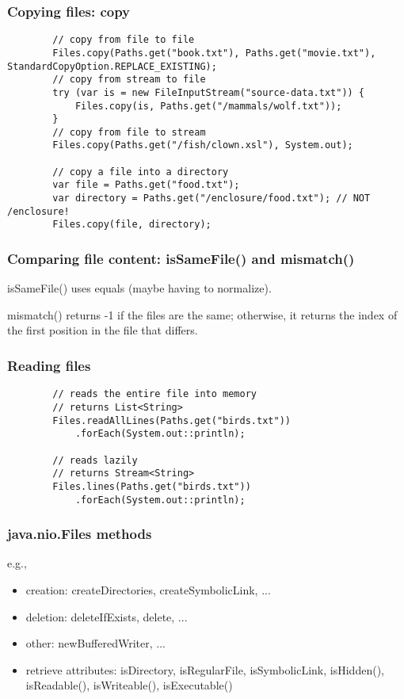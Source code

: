 \documentclass{scrartcl}
\begin{document}
\subsubsection{Copying files: copy}

    \begin{lstlisting}
        // copy from file to file
        Files.copy(Paths.get("book.txt"), Paths.get("movie.txt"), StandardCopyOption.REPLACE_EXISTING);
        // copy from stream to file
        try (var is = new FileInputStream("source-data.txt")) {
            Files.copy(is, Paths.get("/mammals/wolf.txt"));
        }
        // copy from file to stream
        Files.copy(Paths.get("/fish/clown.xsl"), System.out);

        // copy a file into a directory
        var file = Paths.get("food.txt");
        var directory = Paths.get("/enclosure/food.txt"); // NOT /enclosure!
        Files.copy(file, directory);
    \end{lstlisting}

\subsubsection{Comparing file content: isSameFile() and mismatch()}
    isSameFile() uses equals (maybe having to normalize).

    mismatch() returns -1 if the files are the same; otherwise, it returns the index of the first position in the file that differs.

\subsubsection{Reading files}

    \begin{lstlisting}
        // reads the entire file into memory
        // returns List<String>
        Files.readAllLines(Paths.get("birds.txt"))
            .forEach(System.out::println);

        // reads lazily
        // returns Stream<String>
        Files.lines(Paths.get("birds.txt"))
            .forEach(System.out::println);
    \end{lstlisting}

\subsubsection{java.nio.Files methods}

    e.g.,

    \begin{itemize}
        \item creation: createDirectories, createSymbolicLink, ...
        \item deletion: deleteIfExists, delete, ...
        \item other: newBufferedWriter, ...
        \item retrieve attributes: isDirectory, isRegularFile, isSymbolicLink,
            isHidden(), isReadable(), isWriteable(), isExecutable()
    \end{itemize}
\end{document}
